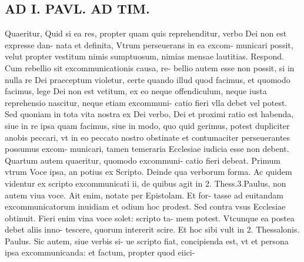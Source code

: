 \documentclass{article}
\begin{document}
\begin{pages}
\section*{AD I. PAVL. AD TIM. }
\marginpar{[ p.MB. ]}\pstart Quaeritur, Quid si ea res, propter quam quis reprehenditur, verbo Dei non est expresse dan- nata et definita, Vtrum perseuerans in ea excom- municari possit, velut propter vestitum nimis sumptuosum, nimias mensae lautitias. Respond. Cum rebellio sit excommunicationis causa, re- bellio autem esse non possit, si in nulla re Dei praeceptum violetur, certe quando illud quod facimus, et quomodo facimus, lege Dei non est vetitum, ex eo neque offendiculum, neque iusta reprehensio nascitur, neque etiam excommuni- catio fieri vlla debet vel potest. Sed quoniam in tota vita nostra ex Dei verbo, Dei et proximi ratio est habenda, siue in re ipsa quam facimus, siue in modo, quo quid gerimus, potest dupliciter anobis peccari, vt in eo peccato nostro obstinate et contumaciter perseuerantes possumus excom- municari, tamen temeraria Ecclesiae iudicia esse non debent. Quartum autem quaeritur, quomodo excommuni- catio fieri debeat. Primum vtrum Voce ipsa, an potius ex Scripto. Deinde qua verborum forma. Ac quidem videntur ex scripto excommunicati ii, de quibus agit in 2. Thess.3.Paulus, non autem viua voce. Ait enim, notate per Epistolam. Et for- tasse ad euitandam excommunicatorum inuidiam et odium hoc prodest. Sed contra vsus Ecclesiae obtinuit. Fieri enim vina voce solet: scripto ta- mem potest. Vtcunque ea postea debet aliis inno- tescere, quorum intererit scire. Et hoc sibi vult in 2. Thessalonis. Paulus. Sic autem, siue verbis si- ue scripto fiat, concipienda est, vt et persona ipsa excommunicanda: et factum, propter quod eiici-  \pend

\end{pages}
\end{document}
